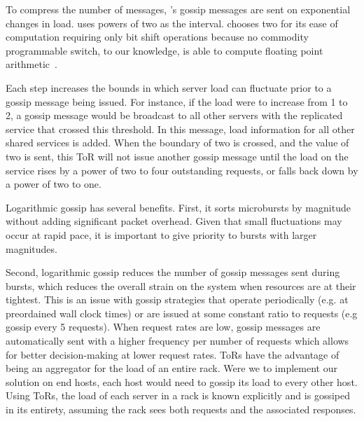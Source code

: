 To compress the number of messages, \daronpon's gossip messages are sent
on exponential changes in load. 
%
\daronpon uses powers of two as the interval. 
%
\daronpon chooses two for its ease of computation requiring only bit shift operations because no commodity programmable switch, to our knowledge, is able to compute floating point arithmetic~\cite{challenging_programable}.

Each step increases the bounds in which server load can fluctuate
prior to a gossip message being issued. 
%
For instance, if the load were to
increase from 1 to 2, a gossip message would be broadcast to all other servers
with the replicated service that crossed this threshold.
%
In this message, load information for all other shared services is added. When the boundary of two is crossed, and the value of two is sent, this ToR will not issue another gossip message until the load on the service rises by a power of two to four outstanding requests, or falls back down by a power of two to one.

Logarithmic gossip has several benefits. 
%
First, it sorts microbursts by magnitude without adding significant packet overhead. Given that small fluctuations may occur at rapid pace, it is important to give priority to bursts with larger magnitudes.
%


Second, logarithmic gossip reduces the number of gossip messages sent during 
bursts, which reduces the overall strain on the system when resources
are at their tightest. 
%
This is an issue with gossip strategies that operate periodically (e.g. at preordained wall clock times) or are issued at some constant ratio
to requests (e.g gossip every 5 requests). 
%
When request rates are low, gossip messages are automatically sent with a higher frequency per number of requests which allows for better decision-making at lower
request rates.
ToRs have the advantage of being an aggregator for the load of an
entire rack. 
%
Were we to implement our solution on end hosts, each host
would need to gossip its load to every other host. 
%
Using ToRs, the load of each server in a rack is known explicitly and is gossiped in its entirety, assuming the rack sees both requests and the associated
responses.


